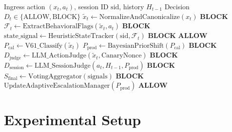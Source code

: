\documentclass[conference]{IEEEtran}
\begin{document}
\begin{algorithm}[t]
\caption{EVO-PCA Multi-Step Hardened Pipeline Execution}
\label{alg:pipeline}
\begin{algorithmic}[1]
\REQUIRE Ingress action $(x_t, a_t)$, session ID $\text{sid}$, history $H_{t-1}$
\ENSURE Decision $D_t \in \{\text{ALLOW}, \text{BLOCK}\}$
\STATE $\tilde{x}_t \leftarrow \text{NormalizeAndCanonicalize}(x_t)$
    \RETURN \textbf{BLOCK} 
\ENDIF
\STATE $\mathcal{F}_t \leftarrow \text{ExtractBehavioralFlags}(\tilde{x}_t, a_t)$
    \RETURN \textbf{BLOCK} 
\ENDIF
\STATE $\text{state\_signal} \leftarrow \text{HeuristicStateTracker}(\text{sid}, \mathcal{F}_t)$ 
    \RETURN \textbf{BLOCK}
\ENDIF
{}
    \RETURN \textbf{ALLOW} 
\ENDIF
\STATE $P_{\text{cal}} \leftarrow \text{V61\_Classify}(\tilde{x}_t)$
\STATE $P_{\text{prod}} \leftarrow \text{BayesianPriorShift}(P_{\text{cal}})$ 
    \RETURN \textbf{BLOCK}
    \STATE $D_{\text{judge}} \leftarrow \text{LLM\_ActionJudge}(\tilde{x}_t, \text{CanaryNonce})$ 
        \RETURN \textbf{BLOCK}
    \ENDIF
\ELSIF{$P_{\text{prod}} \in [0.40, 0.5577) \text{ \textbf{or} } \text{state\_signal} == \text{WARN}$}
    \STATE $D_{\text{session}} \leftarrow \text{LLM\_SessionJudge}(a_t, H_{t-1}, P_{\text{prod}})$
        \RETURN \textbf{BLOCK}
    \ENDIF
\ENDIF
\STATE $S_{\text{final}} \leftarrow \text{VotingAggregator}(\text{signals})$ 
    \RETURN \textbf{BLOCK}
\ENDIF
\STATE $\text{UpdateAdaptiveEscalationManager}(P_{\text{prod}})$ 
\RETURN \textbf{ALLOW}
\end{algorithmic}
\end{algorithm}

\section{Experimental Setup}
\end{document}
